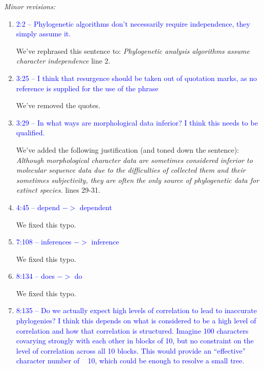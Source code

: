 \documentclass[12pt,letterpaper]{article}
\renewcommand{\subsection}[1]{%
\bigskip
\begin{center}
\begin{large}
\normalfont\itshape #1
\end{large}
\end{center}}
\begin{document}
\subsection{Minor revisions:}

\begin{enumerate}

\item{\textcolor{blue}{2:2 – Phylogenetic algorithms don't necessarily require independence, they simply assume it.}}
\label{abstract}

We've rephrased this sentence to:
\textit{Phylogenetic analysis algorithms assume character independence} line 2.

\item{\textcolor{blue}{3:25 – I think that resurgence should be taken out of quotation marks, as no reference is supplied for the use of the phrase}}

We've removed the quotes.

\item{\textcolor{blue}{3:29 – In what ways are morphological data inferior? I think this needs to be qualified.}}

We've added the following justification (and toned down the sentence):
\textit{Although morphological character data are sometimes considered inferior to molecular sequence data due to the difficulties of collected them and their sometimes subjectivity, they are often the only source of phylogenetic data for extinct species.} lines 29-31.

\item{\textcolor{blue}{4:45 – depend $->$ dependent}}

We fixed this typo.

\item{\textcolor{blue}{7:108 – inferences $->$ inference}}

We fixed this typo.

\item{\textcolor{blue}{8:134 – does $->$ do}}

We fixed this typo.

\item{\textcolor{blue}{8:135 – Do we actually expect high levels of correlation to lead to inaccurate phylogenies? I think this depends on what is considered to be a high level of correlation and how that correlation is structured. Imagine 100 characters covarying strongly with each other in blocks of 10, but no constraint on the level of correlation across all 10 blocks. This would provide an ``effective'' character number of ~ 10, which could be enough to resolve a small tree.}}


\end{enumerate}
\end{document}
